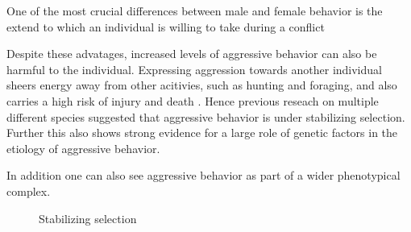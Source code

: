 One of the most crucial differences between male and female behavior is the extend to which an individual is willing to take during a conflict %



Despite these advatages, increased levels of aggressive behavior can also be harmful to the individual.
Expressing aggression towards another individual sheers energy away from other acitivies, such as hunting and foraging, and also carries a high risk of injury and death \cite{Packer1995}.  
Hence previous reseach on multiple different species suggested that aggressive behavior is under stabilizing selection.
Further this also shows strong evidence for a large role of genetic factors in the etiology of aggressive behavior. 


In addition one can also see aggressive behavior as part of a wider phenotypical complex. 

\begin{figure}
	\centering
	\scalebox{0.8}{}
	\caption{Stabilizing selection}
	\label{fig:stab}
\end{figure}

